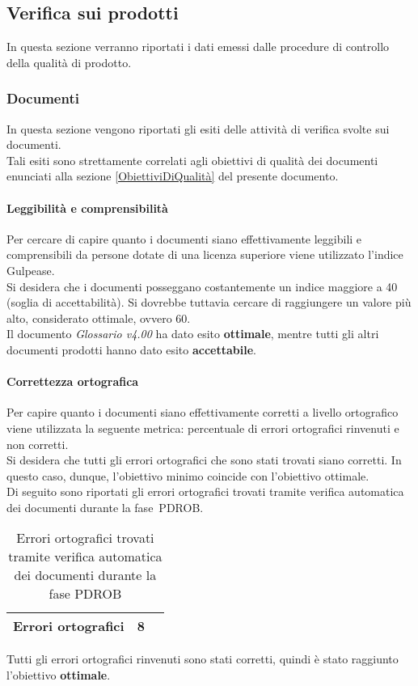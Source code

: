 \documentclass[../PianoDiQualifica.tex]{subfiles}
\begin{document}
\begin{appendices}
			
	\subsection{Verifica sui prodotti}
	In questa sezione verranno riportati i dati emessi dalle procedure di controllo della qualità di prodotto\g.
		\subsubsection{Documenti}
		In questa sezione vengono riportati gli esiti delle attività di verifica svolte sui documenti.\\
		Tali esiti sono strettamente correlati agli obiettivi di qualità dei documenti enunciati alla sezione \ref{ObiettiviDiQualità} del presente documento.
			
			\paragraph{Leggibilità e comprensibilità}
			Per cercare di capire quanto i documenti siano effettivamente leggibili e comprensibili da persone dotate di una licenza superiore viene utilizzato l’indice Gulpease\g.\\
			Si desidera che i documenti posseggano costantemente un indice maggiore a 40 (soglia di accettabilità). Si dovrebbe tuttavia cercare di raggiungere un valore più alto, considerato ottimale, ovvero 60.\\
			Il documento \textit{Glossario v4.00} ha dato esito \textbf{ottimale}, mentre tutti gli altri documenti prodotti hanno dato esito \textbf{accettabile}.
			
			\paragraph{Correttezza ortografica}
			Per capire quanto i documenti siano effettivamente corretti a livello ortografico viene utilizzata la seguente metrica: percentuale di errori ortografici rinvenuti e non corretti.\\
			Si desidera che tutti gli errori ortografici che sono stati trovati siano corretti. In questo caso, dunque, l'obiettivo minimo coincide con l'obiettivo ottimale.\\
			Di seguito sono riportati gli errori ortografici trovati tramite verifica automatica dei documenti durante la fase\g\ PDROB.
			\begin{table}[H]
				\centering
				\begin{tabular}{l * {2}{c}}
					\midrule
					Errori ortografici & 8 \\
					\midrule
				\end{tabular}
				\caption{Errori ortografici trovati tramite verifica automatica dei documenti durante la fase PDROB}
				\label{tab:errori_automatica}
			\end{table}
			Tutti gli errori ortografici rinvenuti sono stati corretti, quindi è stato raggiunto l'obiettivo \textbf{ottimale}.
			

\end{appendices}
\end{document}
